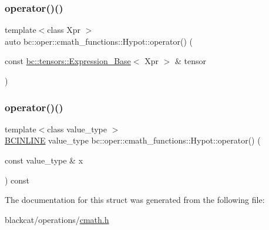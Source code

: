 \mbox{\label{structbc_1_1oper_1_1cmath__functions_1_1Hypot_a435b7ec817e16b7f43c59925d558ef16}} 
\subsubsection{\texorpdfstring{operator()()}{operator()()}\hspace{0.1cm}{\footnotesize\ttfamily [2/3]}}
{\footnotesize\ttfamily template$<$class Xpr $>$ \\
auto bc\+::oper\+::cmath\+\_\+functions\+::\+Hypot\+::operator() (\begin{DoxyParamCaption}\item[{const \hyperlink{classbc_1_1tensors_1_1Expression__Base}{bc\+::tensors\+::\+Expression\+\_\+\+Base}$<$ Xpr $>$ \&}]{tensor }\end{DoxyParamCaption})\hspace{0.3cm}{\ttfamily [inline]}}

\mbox{\label{structbc_1_1oper_1_1cmath__functions_1_1Hypot_ab8fa7883972ed34d4b34fd6610b6feac}} 
\subsubsection{\texorpdfstring{operator()()}{operator()()}\hspace{0.1cm}{\footnotesize\ttfamily [3/3]}}
{\footnotesize\ttfamily template$<$class value\+\_\+type $>$ \\
\hyperlink{common_8h_a6699e8b0449da5c0fafb878e59c1d4b1}{B\+C\+I\+N\+L\+I\+NE} value\+\_\+type bc\+::oper\+::cmath\+\_\+functions\+::\+Hypot\+::operator() (\begin{DoxyParamCaption}\item[{const value\+\_\+type \&}]{x }\end{DoxyParamCaption}) const\hspace{0.3cm}{\ttfamily [inline]}}



The documentation for this struct was generated from the following file\+:\begin{DoxyCompactItemize}
\item 
blackcat/operations/\hyperlink{cmath_8h}{cmath.\+h}\end{DoxyCompactItemize}
